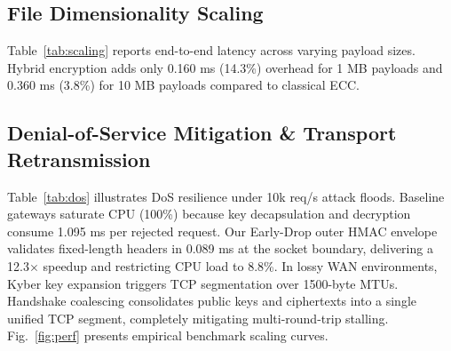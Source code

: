 \documentclass{llncs}
\begin{document}
\subsection{File Dimensionality Scaling}
Table~\ref{tab:scaling} reports end-to-end latency across varying payload sizes. Hybrid encryption adds only 0.160 ms (14.3\%) overhead for 1 MB payloads and 0.360 ms (3.8\%) for 10 MB payloads compared to classical ECC.

\begin{table}[!t]
\centering
\caption{File dimensionality scaling performance across cryptographic modes.}
\label{tab:scaling}
\scriptsize
\setlength{\tabcolsep}{4pt}
\end{table}

\subsection{Denial-of-Service Mitigation \& Transport Retransmission}
Table~\ref{tab:dos} illustrates DoS resilience under 10k req/s attack floods. Baseline gateways saturate CPU (100\%) because key decapsulation and decryption consume 1.095 ms per rejected request. Our Early-Drop outer HMAC envelope validates fixed-length headers in 0.089 ms at the socket boundary, delivering a 12.3$\times$ speedup and restricting CPU load to 8.8\%. In lossy WAN environments, Kyber key expansion triggers TCP segmentation over 1500-byte MTUs. Handshake coalescing consolidates public keys and ciphertexts into a single unified TCP segment, completely mitigating multi-round-trip stalling. Fig.~\ref{fig:perf} presents empirical benchmark scaling curves.
\end{document}
